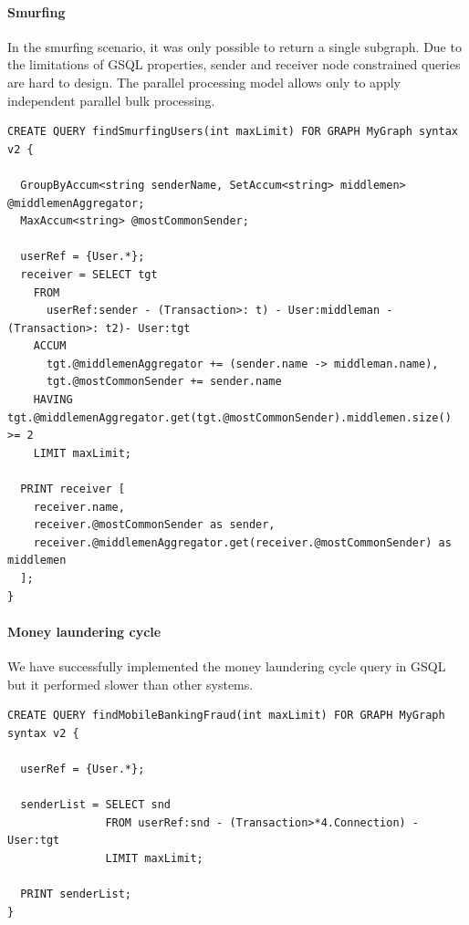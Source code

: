 \paragraph{Smurfing}

In the smurfing scenario, it was only possible to return a single subgraph.
Due to the limitations of GSQL properties, sender and receiver node constrained queries are hard to design.
The parallel processing model allows only to apply independent parallel bulk processing.

\begin{lstlisting}[language=Cypher,frame=single,basicstyle=\footnotesize\ttfamily,caption=GSQL smurfing query]
CREATE QUERY findSmurfingUsers(int maxLimit) FOR GRAPH MyGraph syntax v2 {

  GroupByAccum<string senderName, SetAccum<string> middlemen> @middlemenAggregator;
  MaxAccum<string> @mostCommonSender;

  userRef = {User.*};
  receiver = SELECT tgt
    FROM
      userRef:sender - (Transaction>: t) - User:middleman - (Transaction>: t2)- User:tgt
    ACCUM
      tgt.@middlemenAggregator += (sender.name -> middleman.name),
      tgt.@mostCommonSender += sender.name
    HAVING tgt.@middlemenAggregator.get(tgt.@mostCommonSender).middlemen.size() >= 2
    LIMIT maxLimit;

  PRINT receiver [
    receiver.name,
    receiver.@mostCommonSender as sender,
    receiver.@middlemenAggregator.get(receiver.@mostCommonSender) as middlemen
  ];
}
\end{lstlisting}

\paragraph{Money laundering cycle}

We have successfully implemented the money laundering cycle query in GSQL but it performed slower than other systems.

\begin{lstlisting}[language=Cypher,frame=single,basicstyle=\footnotesize\ttfamily,caption=GSQL money laundering cycle detection query]
CREATE QUERY findMobileBankingFraud(int maxLimit) FOR GRAPH MyGraph syntax v2 {

  userRef = {User.*};

  senderList = SELECT snd
               FROM userRef:snd - (Transaction>*4.Connection) - User:tgt
               LIMIT maxLimit;

  PRINT senderList;
}
\end{lstlisting}

